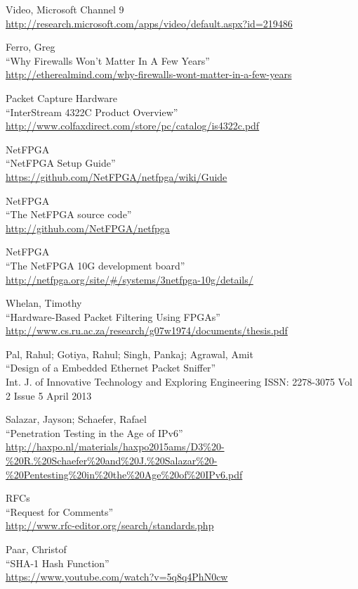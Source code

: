 \begin{thebibliography}{99}
 Video, Microsoft Channel 9\\
\url{http://research.microsoft.com/apps/video/default.aspx?id=219486}

 Ferro, Greg\\
``Why Firewalls Won't Matter In A Few Years''\\
\url{http://etherealmind.com/why-firewalls-wont-matter-in-a-few-years}

 Packet Capture Hardware\\
``InterStream 4322C Product Overview''\\
\url{http://www.colfaxdirect.com/store/pc/catalog/is4322c.pdf}

 NetFPGA\\
``NetFPGA Setup Guide''\\
\url{https://github.com/NetFPGA/netfpga/wiki/Guide}

 NetFPGA\\
``The NetFPGA source code''\\
\url{http://github.com/NetFPGA/netfpga}

 NetFPGA\\
``The NetFPGA 10G development board''\\
\url{http://netfpga.org/site/#/systems/3netfpga-10g/details/}

 Whelan, Timothy\\
``Hardware-Based Packet Filtering Using FPGAs''\\
\url{http://www.cs.ru.ac.za/research/g07w1974/documents/thesis.pdf}

 Pal, Rahul; Gotiya, Rahul; Singh, Pankaj; Agrawal, Amit\\
``Design of a Embedded Ethernet Packet Sniffer''\\
Int. J. of Innovative Technology and Exploring Engineering
ISSN: 2278-3075 Vol 2 Issue 5 April 2013

 Salazar, Jayson; Schaefer, Rafael\\
``Penetration Testing in the Age of IPv6''\\
\url{http://haxpo.nl/materials/haxpo2015ams/D3%20-%20R.%20Schaefer%20and%20J.%20Salazar%20-%20Pentesting%20in%20the%20Age%20of%20IPv6.pdf}

 RFCs\\
``Request for Comments''\\
\url{http://www.rfc-editor.org/search/standards.php}

 Paar, Christof\\
``SHA-1 Hash Function''\\
\url{https://www.youtube.com/watch?v=5q8q4PhN0cw}


\end{thebibliography}
